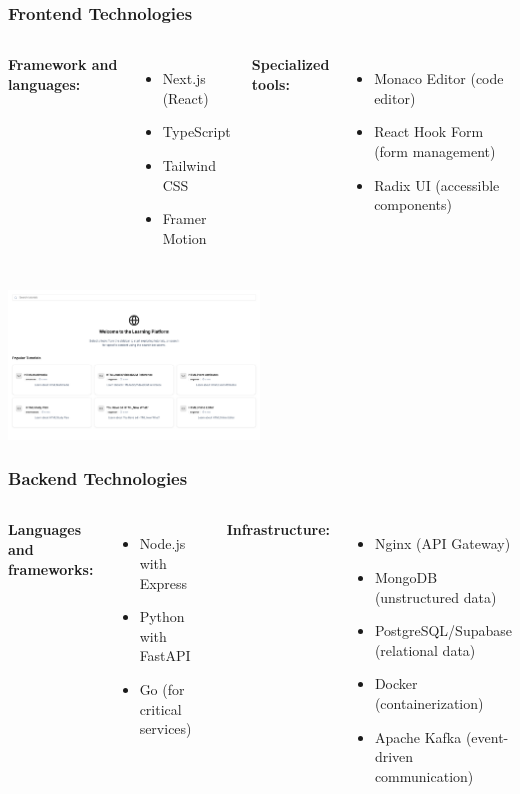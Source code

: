 \documentclass{beamer}
\begin{document}
\begin{frame}
\frametitle{Frontend Technologies}
\begin{columns}
\textbf{Framework and languages:}
\begin{itemize}
    \item Next.js (React)
    \item TypeScript
    \item Tailwind CSS
    \item Framer Motion
\end{itemize}

\textbf{Specialized tools:}
\begin{itemize}
    \item Monaco Editor (code editor)
    \item React Hook Form (form management)
    \item Radix UI (accessible components)
\end{itemize}
\end{columns}
\begin{center}
    \includegraphics[width=0.5\textwidth]{week_3_img/accueil.png}
\end{center}
\end{frame}

\begin{frame}
\frametitle{Backend Technologies}
\begin{columns}
\textbf{Languages and frameworks:}
\begin{itemize}
    \item Node.js with Express
    \item Python with FastAPI
    \item Go (for critical services)
\end{itemize}

\textbf{Infrastructure:}
\begin{itemize}
    \item Nginx (API Gateway)
    \item MongoDB (unstructured data)
    \item PostgreSQL/Supabase (relational data)
    \item Docker (containerization)
    \item Apache Kafka (event-driven communication)
\end{itemize}
\end{columns}
\end{frame}
\end{document}
